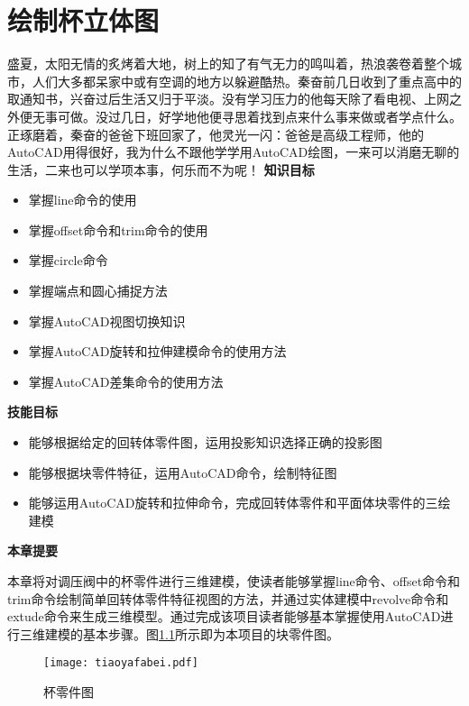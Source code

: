 \chapter{绘制杯立体图}\label{chap:bei}

盛夏，太阳无情的炙烤着大地，树上的知了有气无力的鸣叫着，热浪袭卷着整个城市，人们大多都呆家中或有空调的地方以躲避酷热。秦奋前几日收到了重点高中的取通知书，兴奋过后生活又归于平淡。没有学习压力的他每天除了看电视、上网之外便无事可做。没过几日，好学地他便寻思着找到点来什么事来做或者学点什么。正琢磨着，秦奋的爸爸下班回家了，他灵光一闪：爸爸是高级工程师，他的AutoCAD用得很好，我为什么不跟他学学用AutoCAD绘图，一来可以消磨无聊的生活，二来也可以学项本事，何乐而不为呢！
{\bfseries 知识目标}
\begin{itemize}
\item 掌握line命令的使用
\item 掌握offset命令和trim命令的使用
\item 掌握circle命令
\item 掌握端点和圆心捕捉方法
\item 掌握AutoCAD视图切换知识
\item 掌握AutoCAD旋转和拉伸建模命令的使用方法
\item 掌握AutoCAD差集命令的使用方法
\end{itemize}

{\bfseries 技能目标}
\begin{itemize}
\item 能够根据给定的回转体零件图，运用投影知识选择正确的投影图
\item 能够根据块零件特征，运用AutoCAD命令，绘制特征图
\item 能够运用AutoCAD旋转和拉伸命令，完成回转体零件和平面体块零件的三绘建模
\end{itemize}

{\bfseries 本章提要}

本章将对调压阀中的杯零件进行三维建模，使读者能够掌握line命令、offset命令和trim命令绘制简单回转体零件特征视图的方法，并通过实体建模中revolve命令和extude命令来生成三维模型。通过完成该项目读者能够基本掌握使用AutoCAD进行三维建模的基本步骤。图\ref{fig:tiaoyafabei}所示即为本项目的块零件图。
\noindent
\begin{figure}[htbp]
\centering
\texttt{[image: tiaoyafabei.pdf]}
\caption{杯零件图}\label{fig:tiaoyafabei}
\end{figure}
\endinput